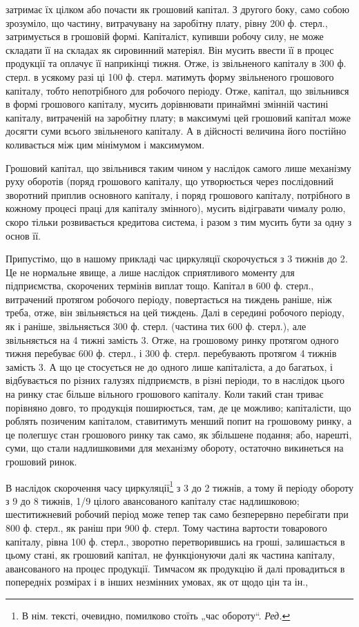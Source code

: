 \parcont{}  %
затримає їх цілком або почасти як грошовий капітал. З другого боку,
само собою зрозуміло, що частину, витрачувану на заробітну плату,
рівну 200 ф. стерл., затримується в грошовій формі. Капіталіст, купивши
робочу силу, не може складати її на складах як сировинний матеріял.
Він мусить ввести її в процес продукції та оплачує її наприкінці тижня.
Отже, із звільненого капіталу в 300 ф. стерл. в усякому разі ці 100 ф.
стерл. матимуть форму звільненого грошового капіталу, тобто непотрібного
для робочого періоду. Отже, капітал, що звільнився в формі грошового
капіталу, мусить дорівнювати принаймні змінній частині капіталу,
витраченій на заробітну плату; в максимумі цей грошовий капітал може
досягти суми всього звільненого капіталу. А в дійсності величина його
постійно коливається між цим мінімумом і максимумом.

Грошовий капітал, що звільнився таким чином у наслідок самого
лише механізму руху оборотів (поряд грошового капіталу, що утворюється
через послідовний зворотний приплив основного капіталу, і поряд грошового
капіталу, потрібного в кожному процесі праці для капіталу змінного),
мусить відігравати чималу ролю, скоро тільки розвивається кредитова
система, і разом з тим мусить бути за одну з основ її.

Припустімо, що в нашому прикладі час циркуляції скорочується
з 3 тижнів до 2. Це не нормальне явище, а лише наслідок сприятливого
моменту для підприємства, скорочених термінів виплат тощо. Капітал
в 600 ф. стерл., витрачений протягом робочого періоду, повертається на
тиждень раніше, ніж треба, отже, він звільняється на цей тиждень. Далі
в середині робочого періоду, як і раніше, звільняється 300 ф. стерл.
(частина тих 600 ф. стерл.), але звільняється на 4 тижні замість 3.
Отже, на грошовому ринку протягом одного тижня перебуває 600 ф.
стерл., і 300 ф. стерл. перебувають протягом 4 тижнів замість 3. А що це
стосується не до одного лише капіталіста, а до багатьох, і відбувається по
різних галузях підприємств, в різні періоди, то в наслідок цього на ринку
стає більше вільного грошового капіталу. Коли такий стан триває порівняно
довго, то продукція поширюється, там, де це можливо; капіталісти,
що роблять позиченим капіталом, ставитимуть менший попит на грошовому
ринку, а це полегшує стан грошового ринку так само, як збільшене
подання; або, нарешті, суми, що стали надлишковими для механізму
обороту, остаточно викинеться на грошовий ринок.

В наслідок скорочення часу циркуляції\footnote*{
В нім. тексті, очевидно, помилково стоїть „час обороту“. \emph{Ред.}
} з 3 до 2 тижнів, а тому й
періоду обороту з 9 до 8 тижнів, 1/9 цілого авансованого капіталу
стає надлишковою; шеститижневий робочий період може тепер так само
безперервно перебігати при 800 ф. стерл., як раніш при 900 ф. стерл.
Тому частина вартости товарового капіталу, рівна 100 ф. стерл., зворотно
перетворившись на гроші, залишається в цьому стані, як грошовий
капітал, не функціонуючи далі як частина капіталу, авансованого на
процес продукції. Тимчасом як продукцію й далі провадиться в попередніх
розмірах і в інших незмінних умовах, як от щодо цін та ін.,
\parbreak{}  %
